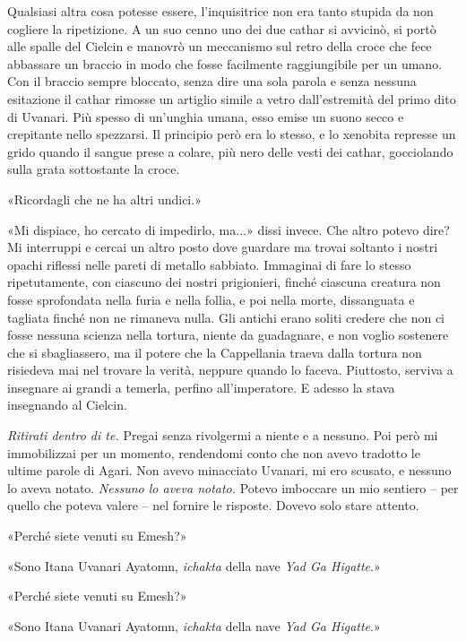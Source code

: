 Qualsiasi altra cosa potesse essere, l'inquisitrice non era tanto
stupida da non cogliere la ripetizione. A un suo cenno uno dei due
cathar si avvicinò, si portò alle spalle del Cielcin e manovrò un
meccanismo sul retro della croce che fece abbassare un braccio in modo
che fosse facilmente raggiungibile per un umano. Con il braccio sempre
bloccato, senza dire una sola parola e senza nessuna esitazione il
cathar rimosse un artiglio simile a vetro dall'estremità del primo dito
di Uvanari. Più spesso di un'unghia umana, esso emise un suono secco e
crepitante nello spezzarsi. Il principio però era lo stesso, e lo
xenobita represse un grido quando il sangue prese a colare, più nero
delle vesti dei cathar, gocciolando sulla grata sottostante la croce.

«Ricordagli che ne ha altri undici.»

«Mi dispiace, ho cercato di impedirlo, ma...» dissi invece. Che altro
potevo dire? Mi interruppi e cercai un altro posto dove guardare ma
trovai soltanto i nostri opachi riflessi nelle pareti di metallo
sabbiato. Immaginai di fare lo stesso ripetutamente, con ciascuno dei
nostri prigionieri, finché ciascuna creatura non fosse sprofondata nella
furia e nella follia, e poi nella morte, dissanguata e {tagliata} finché
non ne rimaneva nulla. Gli antichi erano soliti credere che non ci fosse
nessuna scienza nella tortura, niente da guadagnare, e non voglio
sostenere che si sbagliassero, ma il potere che la Cappellania traeva
dalla tortura non risiedeva mai nel trovare la verità, neppure quando lo
faceva. Piuttosto, serviva a insegnare ai grandi a temerla, perfino
all'imperatore. E adesso la stava insegnando al Cielcin.

\emph{Ritirati dentro di te.} Pregai senza rivolgermi a niente e a
nessuno. Poi però mi immobilizzai per un momento, rendendomi conto che
non avevo tradotto le ultime parole di Agari. Non avevo minacciato
Uvanari, mi ero scusato, e nessuno lo aveva notato. \emph{Nessuno lo
	aveva notato.} Potevo imboccare un mio sentiero -- per quello che poteva
valere -- nel fornire le risposte. Dovevo solo stare attento.

«Perché siete venuti su Emesh?»

«Sono Itana Uvanari Ayatomn, \emph{ichakta} della nave \emph{Yad Ga
	Higatte}.»

\label{fileintero-74.xhtml__idTextAnchor007}{}«Perché
siete venuti su Emesh?»

«Sono Itana Uvanari Ayatomn, \emph{ichakta} della nave \emph{Yad Ga
	Higatte}.»

